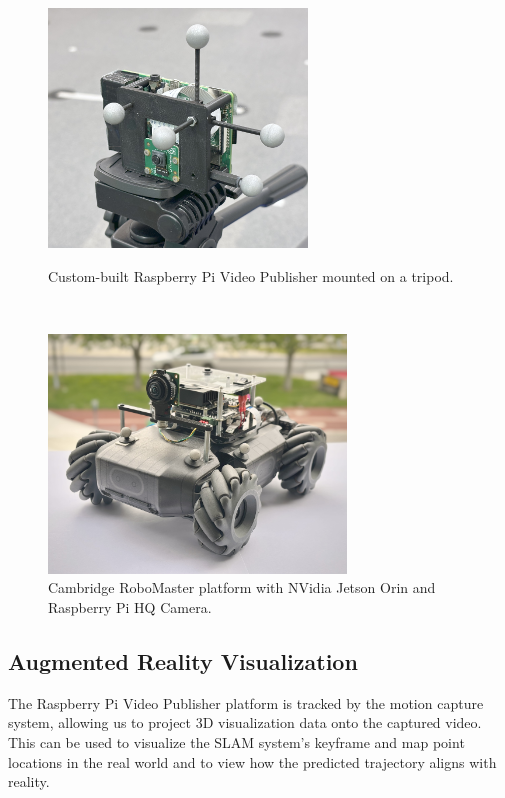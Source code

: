 \begin{figure}[h]
    \centering
    \captionsetup{format=plain}
    \begin{minipage}[t]{0.475\linewidth}
        \centering
        \includegraphics[height=2.5in]{figures/rpi_cam.jpg}

        \caption{Custom-built Raspberry Pi Video Publisher mounted on a tripod.}
        \label{fig:rpi-cam}
    \end{minipage}\hfill%
    ~
    \begin{minipage}[t]{0.475\linewidth}
        \centering
        \includegraphics[height=2.5in]{figures/robomaster.jpg}
        \caption{Cambridge RoboMaster platform with NVidia Jetson Orin and Raspberry Pi HQ Camera.}
        \label{fig:robomaster}
    \end{minipage}
\end{figure}


\subsection{Augmented Reality Visualization}
\label{sec:augmented-reality-visualization}
The Raspberry Pi Video Publisher platform is tracked by the motion capture system, allowing us to project 3D visualization data onto the captured video. This can be used to visualize the SLAM system's keyframe and map point locations in the real world and to view how the predicted trajectory aligns with reality.

